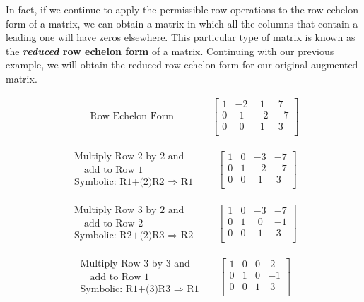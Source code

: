 In fact, if we continue to apply the permissible row operations to the row echelon form of a matrix, we can obtain a matrix in which all the columns that contain a leading one will have zeros elsewhere.  This particular type of matrix is known as the \textbf{\textit{reduced} row echelon form} of a matrix.\pp
Continuing with our previous example, we will obtain the reduced row echelon form for our original augmented matrix.
\begin{example}
\begin{eqnarray*}
~~~~~~~~~~\text{Row Echelon Form}
&&
~~~~~~~~~~\left[
\begin{array}{ccc|c}
1 & -2 & ~~1 & ~7\\
0 & ~~1 & -2 & -7\\
0 & ~~0 & ~~1 & ~3\\
\end{array}
\right]
\end{eqnarray*}

\begin{eqnarray*}
\begin{array}{l}
\text{Multiply Row 2 by 2 and}\\
\text{~~~add to Row 1}\\
\text{Symbolic: R1+(2)R2~}\Rightarrow \text{~R1}
\end{array}
&&
~~\left[
\begin{array}{ccc|c}
1 & 0 & -3 & -7\\
0 & 1 & -2 & -7\\
0 & 0 & ~~1 & ~3\\
\end{array}
\right]
\end{eqnarray*}

\begin{eqnarray*}
\begin{array}{l}
\text{Multiply Row 3 by 2 and}\\
\text{~~~add to Row 2}\\
\text{Symbolic: R2+(2)R3~}\Rightarrow \text{~R2}
\end{array}
&&
~~\left[
\begin{array}{ccc|c}
1 & 0 & -3 & -7\\
0 & 1 & ~~0 & -1\\
0 & 0 & ~~1 & ~3\\
\end{array}
\right]
\end{eqnarray*}

\begin{eqnarray*}
\begin{array}{l}
\text{Multiply Row 3 by 3 and}\\
\text{~~~add to Row 1}\\
\text{Symbolic: R1+(3)R3~}\Rightarrow \text{~R1}
\end{array}
&&
\left[
\begin{array}{ccc|c}
1 & 0 & 0 & ~2\\
0 & 1 & 0 & -1\\
0 & 0 & 1 & ~3\\
\end{array}
\right]
\end{eqnarray*}
\end{example}
